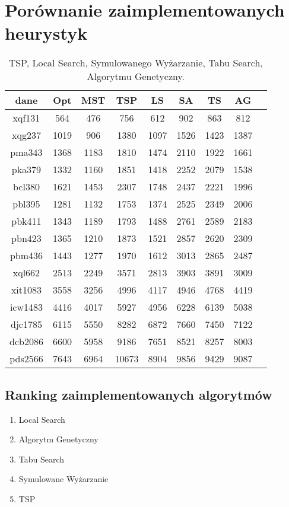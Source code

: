 \documentclass{article}
\begin{document}
\section*{Porównanie zaimplementowanych heurystyk}
\begin{table}[h!]
    \centering
    \begin{tabular}{|c|c|c|c|c|c|c|c|c|}
        \hline
        dane & Opt & MST & TSP & LS & SA & TS & AG \\
        \hline
        xqf131 & 564 & 476 & 756 & 612 & 902 & 863 & 812 \\
        \hline
        xqg237 & 1019 & 906 & 1380 & 1097 & 1526 & 1423 & 1387 \\
        \hline
        pma343 & 1368 & 1183 & 1810 & 1474 & 2110 & 1922 & 1661 \\
        \hline
        pka379 & 1332 & 1160 & 1851 & 1418 & 2252 & 2079 & 1538 \\
        \hline
        bcl380 & 1621 & 1453 & 2307 & 1748 & 2437 & 2221 & 1996 \\
        \hline
        pbl395 & 1281 & 1132 & 1753 & 1374 & 2525 & 2349 & 2006 \\
        \hline
        pbk411 & 1343 & 1189 & 1793 & 1488 & 2761 & 2589 & 2183 \\
        \hline
        pbn423 & 1365 & 1210 & 1873 & 1521 & 2857 & 2620 & 2309 \\
        \hline
        pbm436 & 1443 & 1277 & 1970 & 1612 & 3013 & 2865 & 2487 \\
        \hline
        xql662 & 2513 & 2249 & 3571 & 2813 & 3903 & 3891 & 3009 \\
        \hline
        xit1083 & 3558 & 3256 & 4996 & 4117 & 4946 & 4768 & 4419 \\
        \hline
        icw1483 & 4416 & 4017 & 5927 & 4956 & 6228 & 6139 & 5038 \\
        \hline
        djc1785 & 6115 & 5550 & 8282 & 6872 & 7660 & 7450 & 7122 \\
        \hline
        dcb2086 & 6600 & 5958 & 9186 & 7651 & 8521 & 8257 & 8003 \\
        \hline
        pds2566 & 7643 & 6964 & 10673 & 8904 & 9856 & 9429 & 9087 \\
        \hline
    \end{tabular}
    \caption{TSP, Local Search, Symulowanego Wyżarzanie, Tabu Search, Algorytmu Genetyczny.}
\end{table}

\subsection*{Ranking zaimplementowanych algorytmów}
\begin{enumerate}
    \item Local Search
    \item Algorytm Genetyczny
    \item Tabu Search
    \item Symulowane Wyżarzanie
    \item TSP
\end{enumerate}
\end{document}
